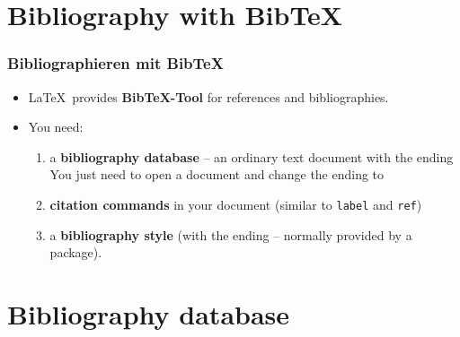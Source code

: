 \section{Bibliography with Bib\TeX }

\begin{frame}[fragile]
\frametitle{Bibliographieren mit BibTeX}

\begin{itemize}
	\item \LaTeX\ provides \textbf{Bib\TeX -Tool} for references and bibliographies.
	
	\item You need:
	
	\begin{enumerate}
		\item a \textbf{bibliography database} -- an ordinary text document with the ending \\
		You just need to open a  document and change the ending to \alert{}
		
		\pause
		
		\item \textbf{citation commands} in your document (similar to \lstinline|label| and \lstinline|ref|)
		
		\pause 
		
		\item a \textbf{bibliography style} (with the ending  -- normally provided by a package).
	\end{enumerate}
	
\end{itemize}

\end{frame}


\section{Bibliography database}

